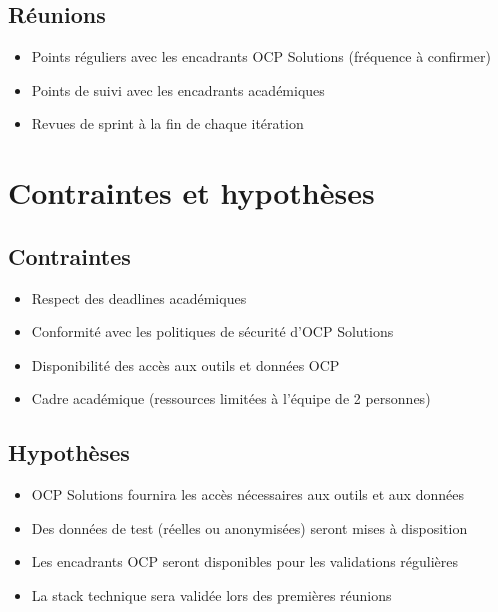 \documentclass[12pt,a4paper]{article}
\begin{document}
\subsection{R\'eunions}
\begin{itemize}[leftmargin=2cm, itemsep=3pt]
    \item[\textcolor{accent}{$\blacktriangleright$}] Points r\'eguliers avec les encadrants OCP Solutions (fr\'equence \`a confirmer)
    \item[\textcolor{accent}{$\blacktriangleright$}] Points de suivi avec les encadrants acad\'emiques
    \item[\textcolor{accent}{$\blacktriangleright$}] Revues de sprint \`a la fin de chaque it\'eration
\end{itemize}

\section{Contraintes et hypoth\`eses}

\subsection{Contraintes}
\begin{itemize}[leftmargin=2cm, itemsep=3pt]
    \item[\textcolor{accent}{$\blacktriangleright$}] Respect des deadlines acad\'emiques
    \item[\textcolor{accent}{$\blacktriangleright$}] Conformit\'e avec les politiques de s\'ecurit\'e d'OCP Solutions
    \item[\textcolor{accent}{$\blacktriangleright$}] Disponibilit\'e des acc\`es aux outils et donn\'ees OCP
    \item[\textcolor{accent}{$\blacktriangleright$}] Cadre acad\'emique (ressources limit\'ees \`a l'\'equipe de 2 personnes)
\end{itemize}

\subsection{Hypoth\`eses}
\begin{itemize}[leftmargin=2cm, itemsep=3pt]
    \item[\textcolor{accent}{$\blacktriangleright$}] OCP Solutions fournira les acc\`es n\'ecessaires aux outils et aux donn\'ees
    \item[\textcolor{accent}{$\blacktriangleright$}] Des donn\'ees de test (r\'eelles ou anonymis\'ees) seront mises \`a disposition
    \item[\textcolor{accent}{$\blacktriangleright$}] Les encadrants OCP seront disponibles pour les validations r\'eguli\`eres
    \item[\textcolor{accent}{$\blacktriangleright$}] La stack technique sera valid\'ee lors des premi\`eres r\'eunions
\end{itemize}
\newpage
\end{document}
